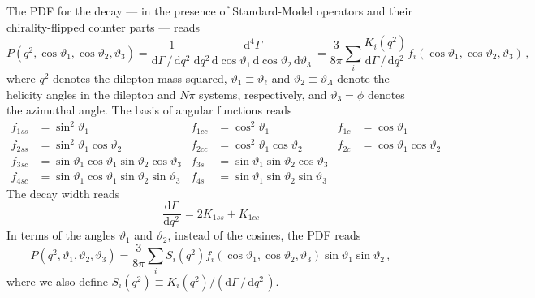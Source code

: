 \documentclass[aps,prd,reprint,nofootinbib,preprintnumbers]{revtex4}
\newcommand{\rmdx}[1]{\mbox{d} #1 \,} %
\renewcommand{\theta}{\vartheta}
\begin{document}
The PDF for the decay --- in the presence of Standard-Model operators and their chirality-flipped counter parts --- reads \cite{Boeer:2014xx}
\begin{equation}
    P(q^2, \cos\theta_1, \cos\theta_2, \theta_3) = \frac{1}{\rmdx{\Gamma} /\, \rmdx{q^2}} \frac{\rmdx{^4\Gamma}}{\rmdx{q^2} \rmdx{\cos\theta_1} \rmdx{\cos\theta_2} \rmdx{\theta_3}} = \frac{3}{8\pi} \sum_i \frac{K_{i}(q^2)}{\rmdx{\Gamma} /\, \rmdx{q^2}} f_i(\cos\theta_1, \cos\theta_2, \theta_3)\,,
\end{equation}
where $q^2$ denotes the dilepton mass squared, $\theta_1 \equiv \theta_\ell$ and $\theta_2 \equiv \theta_\Lambda$ denote the
helicity angles in the dilepton and
$N\pi$ systems, respectively, and $\theta_3 = \phi$ denotes the azimuthal angle.
The basis of angular functions reads \cite{Boeer:2014xx}
\begin{equation}
    \begin{aligned}
        f_{1ss} & = \sin^2\theta_1 &
        f_{1cc} & = \cos^2\theta_1 &
        f_{1c}  & = \cos\theta_1\\
        f_{2ss} & = \sin^2\theta_1 \cos\theta_2 &
        f_{2cc} & = \cos^2\theta_1 \cos\theta_2 &
        f_{2c}  & = \cos\theta_1   \cos\theta_2 \\
        f_{3sc} & = \sin\theta_1 \cos\theta_1 \sin\theta_2 \cos\theta_3 &
        f_{3s}  & = \sin\theta_1              \sin\theta_2 \cos\theta_3 \\
        f_{4sc} & = \sin\theta_1 \cos\theta_1 \sin\theta_2 \sin\theta_3 &
        f_{4s}  & = \sin\theta_1              \sin\theta_2 \sin\theta_3
    \end{aligned}
\end{equation}
The decay width reads
\begin{equation}
    \frac{\rmdx{\Gamma}} {\rmdx{q^2}} = 2 K_{1ss} + K_{1cc}
\end{equation}
In terms of the angles $\theta_1$ and $\theta_2$, instead of the cosines, the PDF reads
\begin{equation}
    P(q^2, \theta_1, \theta_2, \theta_3) = \frac{3}{8\pi} \sum_i S_i(q^2) f_i(\cos\theta_1, \cos\theta_2, \theta_3) \sin\theta_1 \sin\theta_2\,,
\end{equation}
where we also define $S_i(q^2) \equiv K_i(q^2) / (\rmdx{\Gamma} /\, \rmdx{q^2})$.\\
\end{document}
